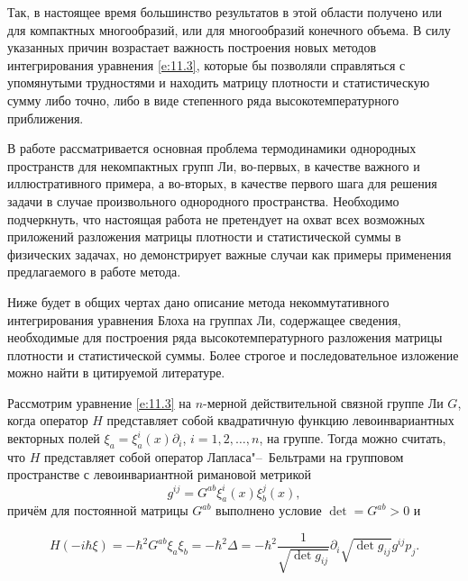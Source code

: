 Так, в настоящее время большинство результатов в этой области получено или для компактных многообразий, или для многообразий конечного объема\cite{mikh:bib:Vas, mikh:bib:CV}. В силу указанных причин возрастает важность построения новых методов интегрирования уравнения  \eqref{e:11.3}, которые бы позволяли справляться с упомянутыми трудностями и находить матрицу плотности и статистическую сумму либо точно, либо в виде степенного ряда высокотемпературного приближения.



В работе рассматривается основная проблема термодинамики однородных пространств для некомпактных групп Ли, во-первых, в качестве важного и иллюстративного примера, а во-вторых, в качестве первого шага для решения задачи в случае произвольного однородного пространства. Необходимо подчеркнуть, что настоящая работа не претендует на охват всех возможных приложений разложения матрицы плотности и статистической суммы в физических задачах, но демонстрирует важные случаи как примеры применения предлагаемого в работе метода.



\smallskip




Ниже будет в общих чертах дано описание метода некоммутативного интегрирования уравнения Блоха на группах Ли, содержащее сведения, необходимые для построения ряда высокотемпературного разложения матрицы плотности и статистической суммы. Более строгое и последовательное изложение можно найти в цитируемой литературе.



Рассмотрим уравнение \eqref{e:11.3} на $n$-мерной действительной связной группе Ли $G$, когда оператор $H$ представляет собой квадратичную функцию левоинвариантных векторных полей $\xi_a=\xi^i_a(x) \partial_i$, $i=1, 2, \dots, n$, на группе. Тогда можно считать, что $H$ представляет собой оператор Лапласа"--~Бельтрами на групповом пространстве с левоинвариантной римановой метрикой $$g^{ij}=G^{ab} \xi^i_a(x) \xi^j_b(x),$$ причём для постоянной матрицы $G^{ab}$ выполнено условие $\det=G^{ab}>0$ и

\begin{equation}\label{Ham}

H(-i\hbar \xi)= -\hbar^2 G^{ab} \xi_a \xi_b = - \hbar^2 \Delta= - \hbar^2 \frac {1}{\sqrt{\det g_{ij}}}\partial_i \sqrt{\det g_{ij}} g^{ij} p_j.

\end{equation}

